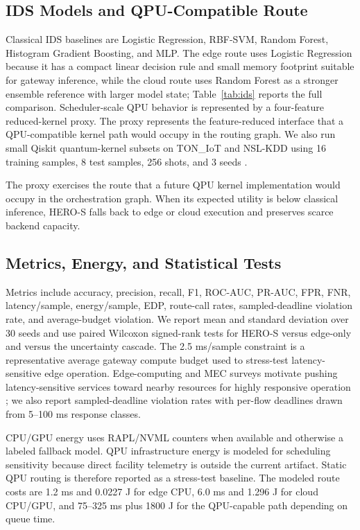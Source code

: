 \documentclass[conference]{IEEEtran}
\begin{document}
\subsection{IDS Models and QPU-Compatible Route}
Classical IDS baselines are Logistic Regression, RBF-SVM, Random Forest, Histogram Gradient Boosting, and MLP. The edge route uses Logistic Regression because it has a compact linear decision rule and small memory footprint suitable for gateway inference, while the cloud route uses Random Forest as a stronger ensemble reference with larger model state; Table~\ref{tab:ids} reports the full comparison. Scheduler-scale QPU behavior is represented by a four-feature reduced-kernel proxy. The proxy represents the feature-reduced interface that a QPU-compatible kernel path would occupy in the routing graph. We also run small Qiskit quantum-kernel subsets on TON\_IoT and NSL-KDD using 16 training samples, 8 test samples, 256 shots, and 3 seeds \cite{qiskit,aer}.

The proxy exercises the route that a future QPU kernel implementation would occupy in the orchestration graph. When its expected utility is below classical inference, HERO-S falls back to edge or cloud execution and preserves scarce backend capacity.

\subsection{Metrics, Energy, and Statistical Tests}
Metrics include accuracy, precision, recall, F1, ROC-AUC, PR-AUC, FPR, FNR, latency/sample, energy/sample, EDP, route-call rates, sampled-deadline violation rate, and average-budget violation. We report mean and standard deviation over 30 seeds and use paired Wilcoxon signed-rank tests for HERO-S versus edge-only and versus the uncertainty cascade. The 2.5 ms/sample constraint is a representative average gateway compute budget used to stress-test latency-sensitive edge operation. Edge-computing and MEC surveys motivate pushing latency-sensitive services toward nearby resources for highly responsive operation \cite{satyanarayanan2017edge,mao2017mec}; we also report sampled-deadline violation rates with per-flow deadlines drawn from 5--100 ms response classes.

CPU/GPU energy uses RAPL/NVML counters when available and otherwise a labeled fallback model. QPU infrastructure energy is modeled for scheduling sensitivity because direct facility telemetry is outside the current artifact. Static QPU routing is therefore reported as a stress-test baseline. The modeled route costs are 1.2 ms and 0.0227 J for edge CPU, 6.0 ms and 1.296 J for cloud CPU/GPU, and 75--325 ms plus 1800 J for the QPU-capable path depending on queue time.
\end{document}
